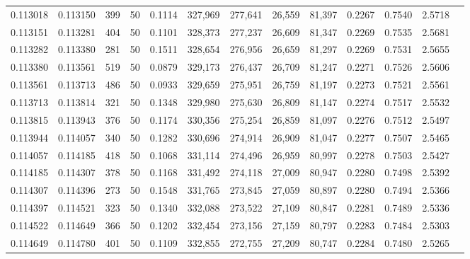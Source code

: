 \begin{tabular}{rrrrrrrrrrrrr}
0.113018 & 0.113150 &   399 &  50 &                                     0.1114 & 327,969 & 277,641 &  26,559 &  81,397 & 0.2267 & 0.7540 & 2.5718 \\
0.113151 & 0.113281 &   404 &  50 &                                     0.1101 & 328,373 & 277,237 &  26,609 &  81,347 & 0.2269 & 0.7535 & 2.5681 \\
0.113282 & 0.113380 &   281 &  50 &                                     0.1511 & 328,654 & 276,956 &  26,659 &  81,297 & 0.2269 & 0.7531 & 2.5655 \\
0.113380 & 0.113561 &   519 &  50 &                                     0.0879 & 329,173 & 276,437 &  26,709 &  81,247 & 0.2271 & 0.7526 & 2.5606 \\
0.113561 & 0.113713 &   486 &  50 &                                     0.0933 & 329,659 & 275,951 &  26,759 &  81,197 & 0.2273 & 0.7521 & 2.5561 \\
0.113713 & 0.113814 &   321 &  50 &                                     0.1348 & 329,980 & 275,630 &  26,809 &  81,147 & 0.2274 & 0.7517 & 2.5532 \\
0.113815 & 0.113943 &   376 &  50 &                                     0.1174 & 330,356 & 275,254 &  26,859 &  81,097 & 0.2276 & 0.7512 & 2.5497 \\
0.113944 & 0.114057 &   340 &  50 &                                     0.1282 & 330,696 & 274,914 &  26,909 &  81,047 & 0.2277 & 0.7507 & 2.5465 \\
0.114057 & 0.114185 &   418 &  50 &                                     0.1068 & 331,114 & 274,496 &  26,959 &  80,997 & 0.2278 & 0.7503 & 2.5427 \\
0.114185 & 0.114307 &   378 &  50 &                                     0.1168 & 331,492 & 274,118 &  27,009 &  80,947 & 0.2280 & 0.7498 & 2.5392 \\
0.114307 & 0.114396 &   273 &  50 &                                     0.1548 & 331,765 & 273,845 &  27,059 &  80,897 & 0.2280 & 0.7494 & 2.5366 \\
0.114397 & 0.114521 &   323 &  50 &                                     0.1340 & 332,088 & 273,522 &  27,109 &  80,847 & 0.2281 & 0.7489 & 2.5336 \\
0.114522 & 0.114649 &   366 &  50 &                                     0.1202 & 332,454 & 273,156 &  27,159 &  80,797 & 0.2283 & 0.7484 & 2.5303 \\
0.114649 & 0.114780 &   401 &  50 &                                     0.1109 & 332,855 & 272,755 &  27,209 &  80,747 & 0.2284 & 0.7480 & 2.5265 \\

\end{tabular}
